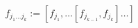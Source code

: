\begin{equation}
f_{j_1 \dots j_k} := [ f_{j_1} , \dots [f_{j_{k-1}},f_{j_k}]\dots ]
\end{equation}

